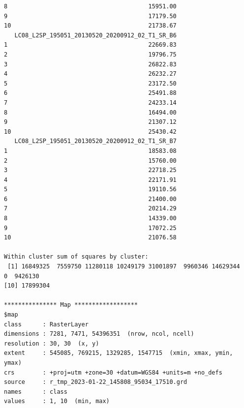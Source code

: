 \documentclass[atmosphere,article,submit,pdftex,moreauthors]{Definitions/mdpi}
\begin{document}
\begin{small}
\begin{verbatim}
8                                        15951.00
9                                        17179.50
10                                       21738.67
   LC08_L2SP_195051_20130520_20200912_02_T1_SR_B6
1                                        22669.83
2                                        19796.75
3                                        26822.83
4                                        26232.27
5                                        23172.50
6                                        25491.88
7                                        24233.14
8                                        16494.00
9                                        21307.12
10                                       25430.42
   LC08_L2SP_195051_20130520_20200912_02_T1_SR_B7
1                                        18583.08
2                                        15760.00
3                                        22718.25
4                                        22171.91
5                                        19110.56
6                                        21400.00
7                                        20214.29
8                                        14339.00
9                                        17072.25
10                                       21076.58

Within cluster sum of squares by cluster:
 [1] 16849325  7559750 11280118 10249179 31001897  9960346 14629344        0  9426130
[10] 17899304

*************** Map ******************
$map
class      : RasterLayer 
dimensions : 7281, 7471, 54396351  (nrow, ncol, ncell)
resolution : 30, 30  (x, y)
extent     : 545085, 769215, 1329285, 1547715  (xmin, xmax, ymin, ymax)
crs        : +proj=utm +zone=30 +datum=WGS84 +units=m +no_defs 
source     : r_tmp_2023-01-22_145808_95034_17510.grd 
names      : class 
values     : 1, 10  (min, max)
\end{verbatim} 
\end{small}
\end{document}
